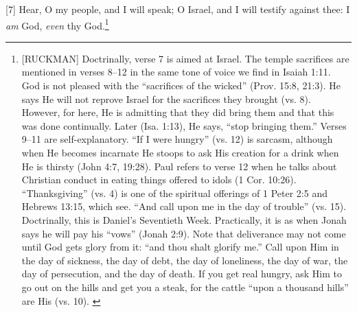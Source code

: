 [7] \textcolor[rgb]{0.00,0.00,1.00}{Hear, O my people, and I will speak; O Israel, and I will testify against thee: I \emph{am} God, \emph{even} thy God.}\footnote{[RUCKMAN] Doctrinally, verse 7 is aimed at Israel. The temple sacrifices are mentioned in verses 8--12 in the same tone of voice we find in Isaiah 1:11. God is not pleased with the “sacrifices of the wicked” (Prov. 15:8, 21:3). He says He will not reprove Israel for the sacrifices they brought (vs. 8). However, for here, He is admitting that they did bring them and that this was done continually. Later (Isa. 1:13), He says, “stop bringing them.” Verses 9--11 are self-explanatory. “If I were hungry” (vs. 12) is sarcasm, although when He becomes incarnate He stoops to ask His creation for a drink when He is thirsty (John 4:7, 19:28). Paul refers to verse 12 when he talks about Christian conduct in eating things offered to idols (1 Cor. 10:26). “Thanksgiving” (vs. 4) is one of the spiritual offerings of 1 Peter 2:5 and Hebrews 13:15, which see. “And call upon me in the day of trouble” (vs. 15). Doctrinally, this is Daniel’s Seventieth Week. Practically, it is as when Jonah says he will pay his “vows” (Jonah 2:9). Note that deliverance may not come until God gets glory from it: “and thou shalt glorify me.” Call upon Him in the day of sickness, the day of debt, the day of loneliness, the day  of war, the day of persecution, and the day of death. If you get real hungry, ask Him to go out on the hills and get you a steak, for the cattle “upon a thousand hills” are His (vs. 10). \cite{Ruckman1992Psalms} }
